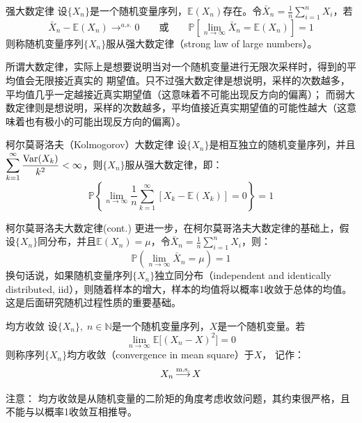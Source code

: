 \documentclass[t]{beamer}
\renewcommand{\Pr}{\mathbb{P}}
\newcommand{\E}{\mathbb{E}}
\newcommand{\Var}{{\rm Var}}
\begin{document}
  \begin{frame}{强大数定律}
    设$\{X_n\}$是一个随机变量序列，$\E(X_n)$存在。令$\bar
    X_n=\displaystyle\frac{1}{n}\sum^n_{i=1}X_i$，若
    \[\bar X_n-\E(X_n)\mathop{\longrightarrow}^{a.s.} 0\qquad
    \text{或}\qquad \Pr\left[\lim_{n\to\infty}\bar
    X_n=\E(X_n)\right]=1 \]
    则称随机变量序列$\{X_n\}$服从强大数定律（strong law of large numbers）。
  
\begin{block}{}
  所谓大数定律，实际上是想要说明当对一个随机变量进行无限次采样时，得到的平均值会无限接近真实的
期望值。只不过强大数定律是想说明，采样的次数越多，平均值几乎一定越接近真实期望值（这意味着不可能出现反方向的偏离）；
而弱大数定律则是想说明，采样的次数越多，平均值接近真实期望值的可能性越大（这意味着也有极小的可能出现反方向的偏离）。
\end{block}

  \end{frame}



 


  \begin{frame}{柯尔莫哥洛夫（Kolmogorov）大数定律}
    设$\{X_n\}$是相互独立的随机变量序列，并且$\displaystyle\sum^{\infty}_{k=1}\frac{\Var(X_k)}{k^2}<\infty$，则$\{X_n\}$服从强大数定律，即：
    \[\Pr\left\{\lim_{n\to\infty}\frac{1}{n}\sum^{\infty}_{k=1}[X_k-\E(X_k)]=0
    \right\}=1 \]
  \end{frame}



 


  \begin{frame}{柯尔莫哥洛夫大数定律(cont.)}
    更进一步，在柯尔莫哥洛夫大数定律的基础上，假设$\{X_n\}$同分布，并且$\E(X_n)=\mu$，令$\bar
X_n=\displaystyle\frac{1}{n}\sum^n_{i=1}X_i$，则：
\[\Pr\left(\lim_{n\to\infty} \bar X_n=\mu  \right)=1 \]
换句话说，如果随机变量序列$\{X_n\}$独立同分布（independent and identically
distributed, iid），则随着样本的增大，样本的均值将以概率1收敛于总体的均值。
这是后面研究随机过程性质的重要基础。
  \end{frame}
  
  \begin{frame}{均方收敛}
    设$\{X_n\},\; n\in\mathbb{N}$是一个随机变量序列，$X$是一个随机变量。若
    \[\lim_{n\to\infty}\E\big[(X_n-X)^2\big]=0 \]
    则称序列$\{X_n\}$均方收敛（convergence in mean square）于$X$，
    记作：
    \[X_n\mathop{\longrightarrow}^{\rm m.s.} X\]
  
    \begin{block}{注意：}     
均方收敛是从随机变量的二阶矩的角度考虑收敛问题，其约束很严格，且不能与以概率1收敛互相推导。
    \end{block}
  \end{frame}
\end{document}
